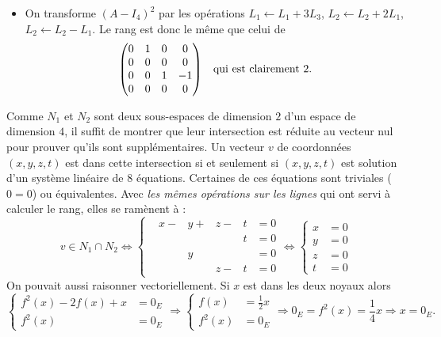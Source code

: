 \begin{enumerate}
\begin{enumerate}
\begin{itemize}
\item  On transforme $(A-I_4)^2$ par les opérations $L_1\leftarrow L_1 +3 L_3$, $L_2\leftarrow L_2 + 2L_1$, $L_2\leftarrow L_2 -L_1$. Le rang est donc le même que celui de
\begin{displaymath}
\begin{pmatrix}
 0&1&0&0\\0&0&0&0\\0&0&1&-1\\0&0&0&0
\end{pmatrix}
\hspace{0.3cm} \text{qui est clairement $2$.}
\end{displaymath}
\end{itemize}
Comme $N_1$ et $N_2$ sont deux sous-espaces de dimension $2$ d'un espace de dimension $4$, il suffit de montrer que leur intersection est réduite au vecteur nul pour prouver qu'ils sont supplémentaires.\newline
 Un vecteur $v$ de coordonnées $(x,y,z,t)$ est dans cette intersection si et seulement si $(x,y,z,t)$ est solution d'un système linéaire de $8$ équations. Certaines de ces équations sont triviales ($0=0$) ou équivalentes. Avec \emph{les mêmes opérations sur les lignes} qui ont servi à calculer le rang, elles se ramènent à :
\begin{displaymath}
 v\in N_1\cap N_2 \Leftrightarrow
\left\lbrace 
\begin{aligned}
 &x - &y + &z - &t &=0\\
 &\phantom{x} &\phantom{y} &\phantom{z} &t &= 0\\
 &\phantom{x} &y &\phantom{z} &\phantom{t} &= 0\\
 &\phantom{x} &\phantom{y} &z -&t &=0
\end{aligned}
\right.
\Leftrightarrow
\left\lbrace 
\begin{aligned}
 x &=0\\
 y &= 0\\
 z &= 0\\
 t &=0
\end{aligned}
\right.
\end{displaymath}
On pouvait aussi raisonner vectoriellement. Si $x$ est dans les deux noyaux alors 
\begin{displaymath}
 \left\lbrace
\begin{aligned}
f^2(x)-2f(x)+x&=0_E\\
f^2(x)&=0_E 
\end{aligned}
\right.
\Rightarrow
 \left\lbrace
\begin{aligned}
f(x)&= \frac{1}{2}x\\
f^2(x)&=0_E 
\end{aligned}
\right.
 \Rightarrow
0_E=f^2(x)=\frac{1}{4}x
 \Rightarrow x=0_E .
\end{displaymath}


\end{enumerate}
\end{enumerate}
